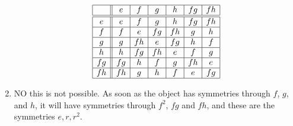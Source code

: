 \documentclass[noauthor,nooutcomes,12pt,hints]{ximera}
\begin{document}
\begin{question}
\begin{freeResponse}
\begin{enumerate}
\[\begin{array}{|c||c|c|c|c|c|c|}
        \hline
        & e  & f   & g  & h  & fg & fh  \\ \hline\hline
        e  & e  & f   & g  & h  & fg & fh  \\ \hline
        f  & f  & e   & fg & fh & g  & h   \\ \hline
        g  & g  & fh  & e  & fg & h  & f   \\ \hline
        h  & h  & fg  & fh & e  & f  & g   \\ \hline
        fg & fg & h   & f  & g  & fh & e   \\ \hline
        fh & fh & g   & h  & f  & e  & fg  \\ \hline
      \end{array}
      \]
    \item NO this is not possible. As soon as the object has
      symmetries through $f$, $g$, and $h$, it will have symmetries
      through $f^2$, $fg$ and $fh$, and these are the symmetries
      $e,r,r^2$.
    \end{enumerate}
  \end{freeResponse}
\end{question}
\end{document}
